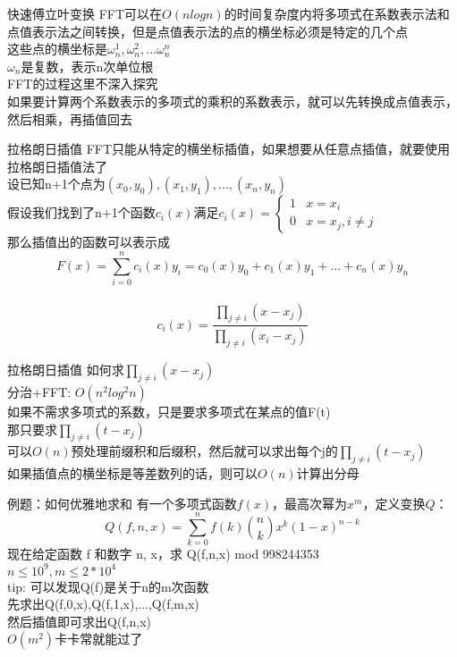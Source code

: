\documentclass{beamer}
\begin{document}
\begin{frame}{快速傅立叶变换}
FFT可以在$O(nlogn)$的时间复杂度内将多项式在系数表示法和点值表示法之间转换，但是点值表示法的点的横坐标必须是特定的几个点\\
这些点的横坐标是$\omega_n^1,\omega_n^2,...\omega_n^n$\\
$\omega_n$是复数，表示n次单位根\\
FFT的过程这里不深入探究\\
如果要计算两个系数表示的多项式的乘积的系数表示，就可以先转换成点值表示，然后相乘，再插值回去
\end{frame}

\begin{frame}{拉格朗日插值}
FFT只能从特定的横坐标插值，如果想要从任意点插值，就要使用拉格朗日插值法了\\
\pause
设已知n+1个点为$(x_0,y_0),(x_1,y_1),...,(x_n,y_n)$\\
假设我们找到了n+1个函数$c_i(x)$满足$c_i(x)=\left\{
\begin{array}{ll}

1&\text{$x=x_i$}\\

0&\text{$x=x_j,i\neq j$}

\end{array}\right.
$\\
\pause
那么插值出的函数可以表示成$$F(x)=\sum_{i=0}^{n}c_i(x)y_i=c_0(x)y_0+c_1(x)y_1+...+c_n(x)y_n$$\\
\pause
$$c_i(x)=\frac{\prod_{j\neq i}(x-x_j)}{\prod_{j\neq i}(x_i-x_j)}$$

\end{frame}

\begin{frame}{拉格朗日插值}
如何求$\prod_{j\neq i}(x-x_j)$\\
分治+FFT: $O(n^2log^2n)$\\
\pause
如果不需求多项式的系数，只是要求多项式在某点的值F(t)\\
那只要求$\prod_{j\neq i}(t-x_j)$\\
可以$O(n)$预处理前缀积和后缀积，然后就可以求出每个j的$\prod_{j\neq i}(t-x_j)$\\
如果插值点的横坐标是等差数列的话，则可以$O(n)$计算出分母\\
\end{frame}

\begin{frame}{例题：如何优雅地求和}
有一个多项式函数$f(x)$，最高次幂为$x^m$，定义变换$Q$：
$$Q(f,n,x)=\sum_{k=0}^{n}f(k)\binom{n}{k}x^k(1-x)^{n-k}$$
现在给定函数 f 和数字 n, x，求 Q(f,n,x) mod 998244353\\
$n\leqslant 10^9,m\leqslant 2*10^4$\\
tip: 可以发现Q(f)是关于n的m次函数\\
\pause
先求出Q(f,0,x),Q(f,1,x),...,Q(f,m,x)\\
然后插值即可求出Q(f,n,x)\\
$O(m^2)$卡卡常就能过了\\
\end{frame}
\end{document}

